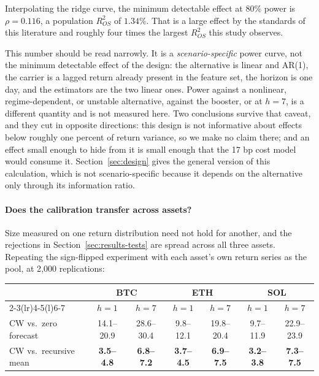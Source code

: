 \documentclass{article}
\theoremstyle{plain}
\theoremstyle{definition}
\newcommand{\rsq}{R^2_{OS}}
\begin{document}
Interpolating the ridge curve, the minimum detectable effect at 80\% power is
$\rho = 0.116$, a population $\rsq$ of $1.34\%$. That is a large effect by the standards of
this literature and roughly four times the largest $\rsq$ this study observes.

This number should be read narrowly. It is a \emph{scenario-specific} power curve, not the
minimum detectable effect of the design: the alternative is linear and AR(1), the carrier is
a lagged return already present in the feature set, the horizon is one day, and the estimators
are the two linear ones. Power against a nonlinear, regime-dependent, or unstable alternative,
against the booster, or at $h=7$, is a different quantity and is not measured here. Two
conclusions survive that caveat, and they cut in opposite directions: this design is not
informative about effects below roughly one percent of return variance, so we make no claim
there; and an effect small enough to hide from it is small enough that the 17 bp cost model
would consume it. Section~\ref{sec:design} gives the general version of this calculation,
which is not scenario-specific because it depends on the alternative only through its
information ratio.

\paragraph{Does the calibration transfer across assets?}
Size measured on one return distribution need not hold for another, and the rejections in
Section~\ref{sec:results-tests} are spread across all three assets. Repeating the sign-flipped
experiment with each asset's own return series as the pool, at 2{,}000 replications:

\begin{center}
  \small
  \begin{tabular}{lcccccc}
    \toprule
    & \multicolumn{2}{c}{BTC} & \multicolumn{2}{c}{ETH} & \multicolumn{2}{c}{SOL} \\
    \cmidrule(lr){2-3}\cmidrule(lr){4-5}\cmidrule(l){6-7}
    & $h{=}1$ & $h{=}7$ & $h{=}1$ & $h{=}7$ & $h{=}1$ & $h{=}7$ \\
    \midrule
    CW vs.\ zero forecast  & 14.1--20.9 & 28.6--30.4 & 9.8--12.1 & 19.8--20.4 & 9.7--11.9 & 22.9--23.9 \\
    CW vs.\ recursive mean & \textbf{3.5--4.8} & \textbf{6.8--7.2} & \textbf{3.7--4.5} & \textbf{6.9--7.5} & \textbf{3.2--3.8} & \textbf{7.3--7.5} \\
    \bottomrule
  \end{tabular}
\end{center}
\end{document}
